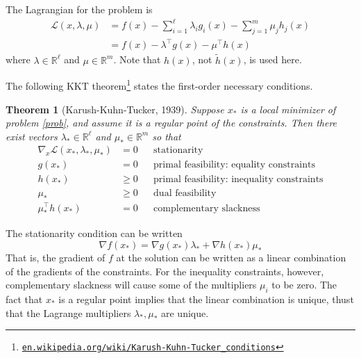 \documentclass[11pt]{amsart}
\newtheorem*{thm}{Theorem}
\newcommand{\RR}{\mathbb{R}}
\newcommand{\grad}{\nabla}
\begin{document}
The Lagrangian for the problem is
\begin{align*}
\mathcal{L}(x,\lambda,\mu) &= f(x) - \sum_{i=1}^\ell \lambda_i g_i(x) - \sum_{j=1}^m \mu_j h_j(x) \\
  &= f(x) - \lambda^\top g(x) - \mu^\top h(x)
\end{align*}
where $\lambda\in\RR^\ell$ and $\mu\in\RR^m$.  Note that $h(x)$, not $\tilde h(x)$, is used here.

The following KKT theorem\footnote{\href{https://en.wikipedia.org/wiki/Karush-Kuhn-Tucker_conditions}{\texttt{en.wikipedia.org/wiki/Karush-Kuhn-Tucker\_conditions}}} states the first-order necessary conditions.

\begin{thm}[Karush-Kuhn-Tucker, 1939]  Suppose $x_*$ is a local minimizer of problem \eqref{prob}, and assume it is a regular point of the constraints.  Then there exist vectors $\lambda_*\in\RR^\ell$ and $\mu_*\in\RR^m$ so that
\begin{align*}
\grad_x \mathcal{L}(x_*,\lambda_*,\mu_*) &= 0 &&\text{stationarity} \\
g(x_*) &= 0  &&\text{primal feasibility: equality constraints} \\
h(x_*) &\ge 0  &&\text{primal feasibility: inequality constraints} \\
\mu_* &\ge 0 &&\text{dual feasibility} \\
\mu_*^\top h(x_*) &= 0 &&\text{complementary slackness}
\end{align*}
\end{thm}

\medskip
\noindent The stationarity condition can be written
    $$\grad f(x_*) = \grad g(x_*) \lambda_* + \grad h(x_*) \mu_*$$
That is, the gradient of $f$ at the solution can be written as a linear combination of the gradients of the constraints.  For the inequality constraints, however, complementary slackness will cause some of the multipliers $\mu_i$ to be zero.  The fact that $x_*$ is a regular point implies that the linear combination is unique, thust that the Lagrange multipliers $\lambda_*,\mu_*$ are unique.
\end{document}
